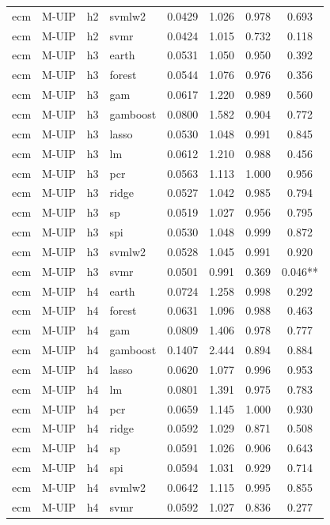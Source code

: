 \begin{ThreePartTable}
\begin{longtable}[t]{llclcccc}
ecm & M-UIP & h2 & svmlw2 & 0.0429 & 1.026 & 0.978 & 0.693\\
ecm & M-UIP & h2 & svmr & 0.0424 & 1.015 & 0.732 & 0.118\\
\addlinespace
ecm & M-UIP & h3 & earth & 0.0531 & 1.050 & 0.950 & 0.392\\
ecm & M-UIP & h3 & forest & 0.0544 & 1.076 & 0.976 & 0.356\\
ecm & M-UIP & h3 & gam & 0.0617 & 1.220 & 0.989 & 0.560\\
ecm & M-UIP & h3 & gamboost & 0.0800 & 1.582 & 0.904 & 0.772\\
ecm & M-UIP & h3 & lasso & 0.0530 & 1.048 & 0.991 & 0.845\\
ecm & M-UIP & h3 & lm & 0.0612 & 1.210 & 0.988 & 0.456\\
ecm & M-UIP & h3 & pcr & 0.0563 & 1.113 & 1.000 & 0.956\\
ecm & M-UIP & h3 & ridge & 0.0527 & 1.042 & 0.985 & 0.794\\
ecm & M-UIP & h3 & sp & 0.0519 & 1.027 & 0.956 & 0.795\\
ecm & M-UIP & h3 & spi & 0.0530 & 1.048 & 0.999 & 0.872\\
ecm & M-UIP & h3 & svmlw2 & 0.0528 & 1.045 & 0.991 & 0.920\\
ecm & M-UIP & h3 & svmr & 0.0501 & 0.991 & 0.369 & 0.046**\\
\addlinespace
ecm & M-UIP & h4 & earth & 0.0724 & 1.258 & 0.998 & 0.292\\
ecm & M-UIP & h4 & forest & 0.0631 & 1.096 & 0.988 & 0.463\\
ecm & M-UIP & h4 & gam & 0.0809 & 1.406 & 0.978 & 0.777\\
ecm & M-UIP & h4 & gamboost & 0.1407 & 2.444 & 0.894 & 0.884\\
ecm & M-UIP & h4 & lasso & 0.0620 & 1.077 & 0.996 & 0.953\\
ecm & M-UIP & h4 & lm & 0.0801 & 1.391 & 0.975 & 0.783\\
ecm & M-UIP & h4 & pcr & 0.0659 & 1.145 & 1.000 & 0.930\\
ecm & M-UIP & h4 & ridge & 0.0592 & 1.029 & 0.871 & 0.508\\
ecm & M-UIP & h4 & sp & 0.0591 & 1.026 & 0.906 & 0.643\\
ecm & M-UIP & h4 & spi & 0.0594 & 1.031 & 0.929 & 0.714\\
ecm & M-UIP & h4 & svmlw2 & 0.0642 & 1.115 & 0.995 & 0.855\\
ecm & M-UIP & h4 & svmr & 0.0592 & 1.027 & 0.836 & 0.277\\

\end{longtable}
\end{ThreePartTable}
